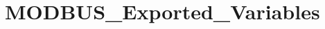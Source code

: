 \hypertarget{group___m_o_d_b_u_s___exported___variables}{}\section{M\+O\+D\+B\+U\+S\+\_\+\+Exported\+\_\+\+Variables}
\label{group___m_o_d_b_u_s___exported___variables}
